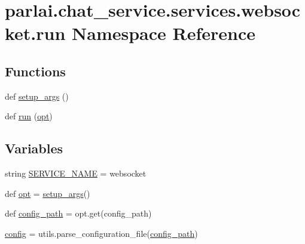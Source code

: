 \hypertarget{namespaceparlai_1_1chat__service_1_1services_1_1websocket_1_1run}{}\section{parlai.\+chat\+\_\+service.\+services.\+websocket.\+run Namespace Reference}
\label{namespaceparlai_1_1chat__service_1_1services_1_1websocket_1_1run}
\subsection*{Functions}
\begin{DoxyCompactItemize}
\item 
def \hyperlink{namespaceparlai_1_1chat__service_1_1services_1_1websocket_1_1run_a3335f62a1f0f68151449b8ecef1d9908}{setup\+\_\+args} ()
\item 
def \hyperlink{namespaceparlai_1_1chat__service_1_1services_1_1websocket_1_1run_aa7edf5a6148ae51bad84b084237002fe}{run} (\hyperlink{namespaceparlai_1_1chat__service_1_1services_1_1websocket_1_1run_a165147f24240a5c6556812e7841627a6}{opt})
\end{DoxyCompactItemize}
\subsection*{Variables}
\begin{DoxyCompactItemize}
\item 
string \hyperlink{namespaceparlai_1_1chat__service_1_1services_1_1websocket_1_1run_a4ed08d03fa69aafe95debd23593c75b5}{S\+E\+R\+V\+I\+C\+E\+\_\+\+N\+A\+ME} = \textquotesingle{}websocket\textquotesingle{}
\item 
def \hyperlink{namespaceparlai_1_1chat__service_1_1services_1_1websocket_1_1run_a165147f24240a5c6556812e7841627a6}{opt} = \hyperlink{namespaceparlai_1_1chat__service_1_1services_1_1websocket_1_1run_a3335f62a1f0f68151449b8ecef1d9908}{setup\+\_\+args}()
\item 
def \hyperlink{namespaceparlai_1_1chat__service_1_1services_1_1websocket_1_1run_a33e4ea49b968523396e63dcb91524031}{config\+\_\+path} = opt.\+get(\textquotesingle{}config\+\_\+path\textquotesingle{})
\item 
\hyperlink{namespaceparlai_1_1chat__service_1_1services_1_1websocket_1_1run_ac583a14d08de85e9c7be6267d13b1a91}{config} = utils.\+parse\+\_\+configuration\+\_\+file(\hyperlink{namespaceparlai_1_1chat__service_1_1services_1_1websocket_1_1run_a33e4ea49b968523396e63dcb91524031}{config\+\_\+path})
\end{DoxyCompactItemize}



